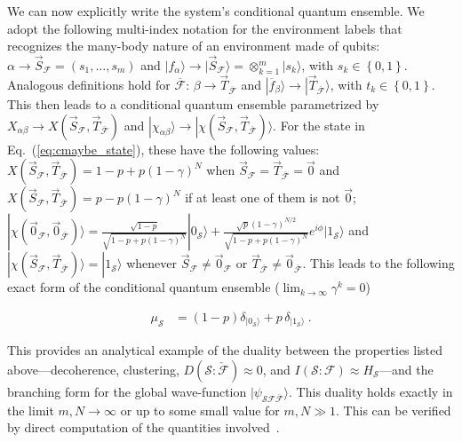 \documentclass[a4paper,11pt,accepted=2024-09-14]{quantumarticle}
\newcommand{\ket}[1]    {| #1 \rangle}
\newcommand{\+}         {\dagger}
\newcommand{\mc}[1]{\mathcal{#1}}
\begin{document}
We can now explicitly write the system's {conditional quantum ensemble}. We adopt the following multi-index notation for the environment labels that recognizes the many-body nature of an environment made of qubits: $\alpha \to \vec{S}_\mc{F}= (s_1,\ldots,s_m)$ and $\ket{f_\alpha} \to \ket{\vec{S}_{\mc{F}}}=\otimes_{k=1}^m \ket{s_k}$, with $s_k \in \left\{ 0,1\right\}$. Analogous definitions hold for $\overline{\mc{F}}$: $\beta \to \vec{T}_{\overline{\mc{F}}}$ and  $\ket{\overline{f}_\beta} \to \ket{\vec{T}_{\overline{\mc{F}}}}$, with $t_k \in \left\{ 0,1\right\}$. This then leads to a {conditional quantum ensemble} parametrized by $X_{\alpha \beta} \to X(\vec{S}_{\mc{F}},\vec{T}_{\overline{\mc{F}}})$ and $\ket{\chi_{\alpha \beta}} \to \ket{\chi(\vec{S}_{\mc{F}},\vec{T}_{\overline{\mc{F}}})}$. For the state in Eq.~(\ref{eq:cmaybe_state}), these have the following values: $X(\vec{S}_{\mc{F}},\vec{T}_{\overline{\mc{F}}}) = 1-p + p(1-\gamma)^N$ when $\vec{S}_{\mc{F}} = \vec{T}_{\overline{\mc{F}}} = \vec{0}$ and $X(\vec{S}_{\mc{F}},\vec{T}_{\overline{\mc{F}}}) = p - p(1-\gamma)^N$ if at least one of them is not $\vec{0}$; $\ket{\chi(\vec{0}_{\mc{F}},\vec{0}_{\overline{\mc{F}}})}= \frac{\sqrt{1-p}}{\sqrt{1-p+p(1-\gamma)^N}} \ket{0_{\mc{S}}}+\frac{\sqrt{p} (1-\gamma)^{N/2}}{\sqrt{1-p+p(1-\gamma)^N}} e^{i\phi}\ket{1_{\mc{S}}}$ and $\ket{\chi(\vec{S}_{\mc{F}},\vec{T}_{\overline{\mc{F}}})}=\ket{1_{\mc{S}}}$ whenever $\vec{S}_{\mc{F}}\neq \vec{0}_\mc{F}$ or $\vec{T}_{\overline{\mc{F}}} \neq \vec{0}_{\overline{\mc{F}}}$. This leads to the following exact form of the {conditional quantum ensemble} ($\lim_{k \to \infty} \gamma^k = 0$)

\begin{align}
\mu_{\mc{S}} & = (1-p) \delta_{\ket{0_{\mc{S}}}} + p \, \delta_{\ket{1_{\mc{S}}}}
  ~.
\end{align}

This provides an analytical example of the duality between the properties listed above---decoherence, clustering, $D(\mc{S}:\check{\mc{F}})\approx 0$, and $I(\mc{S}:{\mc{F}})\approx H_\mc{S}$---and the branching form for the global wave-function $\ket{\psi_{\mc{S}\mc{F}\overline{\mc{F}}}}$. This duality holds exactly in the limit $m,N \to \infty$ or up to some small value for $m,N \gg 1$. This can be verified by direct computation of the quantities involved~\cite{touil2021eavesdropping}.
\end{document}
